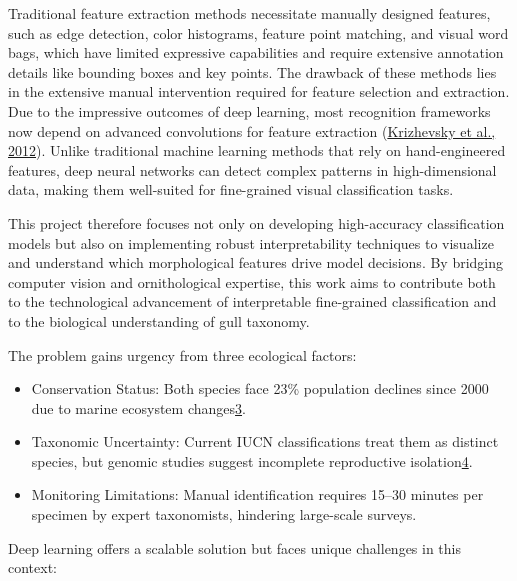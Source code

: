 \documentclass[a4paper,12pt]{article}
\begin{document}
Traditional feature extraction methods necessitate manually designed features, such as edge detection, color histograms, feature point matching, and visual word bags, which have limited expressive capabilities and require extensive annotation details like bounding boxes and key points. The drawback of these methods lies in the extensive manual intervention required for feature selection and extraction. Due to the impressive outcomes of deep learning, most recognition frameworks now depend on advanced convolutions for feature extraction (\href{https://www.frontiersin.org/journals/neurorobotics/articles/10.3389/fnbot.2024.1391791/full#ref10}{Krizhevsky et al., 2012}).
Unlike traditional machine learning methods that rely on hand-engineered features, deep neural networks can detect complex patterns in high-dimensional data, making them well-suited for fine-grained visual classification tasks.

This project therefore focuses not only on developing high-accuracy classification models but also on implementing robust interpretability techniques to visualize and understand which morphological features drive model decisions. By bridging computer vision and ornithological expertise, this work aims to contribute both to the technological advancement of interpretable fine-grained classification and to the biological understanding of gull taxonomy.

The problem gains urgency from three ecological factors:

\begin{itemize}
\item Conservation Status: Both species face 23\% population declines since 2000 due to marine ecosystem changes\href{https://students.unimelb.edu.au/academic-skills/resources/reading,-writing-and-referencing/reports/research-reports}{3}.


\item Taxonomic Uncertainty: Current IUCN classifications treat them as distinct species, but genomic studies suggest incomplete reproductive isolation\href{https://scikit-learn.org/stable/modules/generated/sklearn.metrics.classification_report.html}{4}.


\item Monitoring Limitations: Manual identification requires 15–30 minutes per specimen by expert taxonomists, hindering large-scale surveys.


\end{itemize}
Deep learning offers a scalable solution but faces unique challenges in this context:
\end{document}
